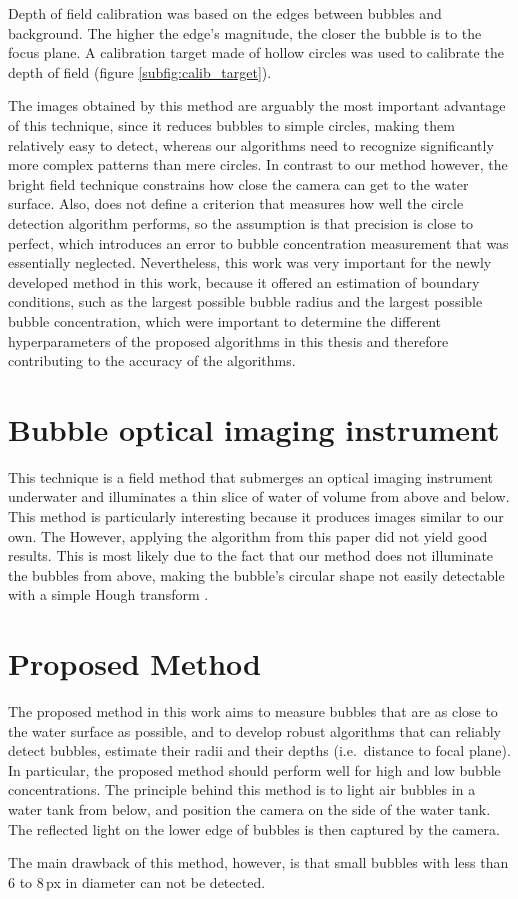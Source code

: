 	Depth of field calibration was based on the edges between bubbles and background. The higher the edge's magnitude, the closer the bubble is to the focus plane. A calibration target made of hollow circles was used to calibrate the depth of field (figure \ref{subfig:calib_target}). 
	
	The images obtained by this method are arguably the most important advantage of this technique, since it reduces bubbles to simple circles, making them relatively easy to detect, whereas our algorithms need to recognize significantly more complex patterns than mere circles.
	 In contrast to our method however, the bright field technique constrains how close the camera can get to the water surface. Also, \citet{Leonie} does not define a criterion that measures how well the circle detection algorithm performs, so the assumption is that precision is close to perfect, which introduces an error to bubble concentration measurement that was essentially neglected. 
	 Nevertheless, this work was very important for the newly developed method in this work, because it offered an estimation of boundary conditions, such as the largest possible bubble radius and the largest possible bubble concentration, which were important to determine the different hyperparameters of the proposed algorithms in this thesis and therefore contributing to the accuracy of the algorithms. 
	
	
\section{Bubble optical imaging instrument}
	This technique is a field method that submerges an optical imaging instrument underwater and illuminates a thin slice	of water of volume from above and below. 
	This method is particularly interesting because it produces images similar to our own. The
	However, applying the algorithm from this paper did not yield good results. This is most likely due to the fact that our method does not illuminate the bubbles from above, making the bubble's circular shape not easily detectable with a simple Hough transform \citep{Hough1972}.


\section{Proposed Method}
The proposed method in this work aims to measure bubbles that are as close to the water surface as possible, and to develop robust algorithms that can reliably detect bubbles, estimate their radii and their depths (i.e.\ distance to focal plane). In particular, the proposed method should perform well for high and low bubble concentrations. 
The principle behind this method is to light air bubbles in a water tank from below, and position the camera on the side of the water tank. The reflected light on the lower edge of bubbles is then captured by the camera. 

The main drawback of this method, however, is that small bubbles with less than 6 to 8\,px in diameter can not be detected. 




















